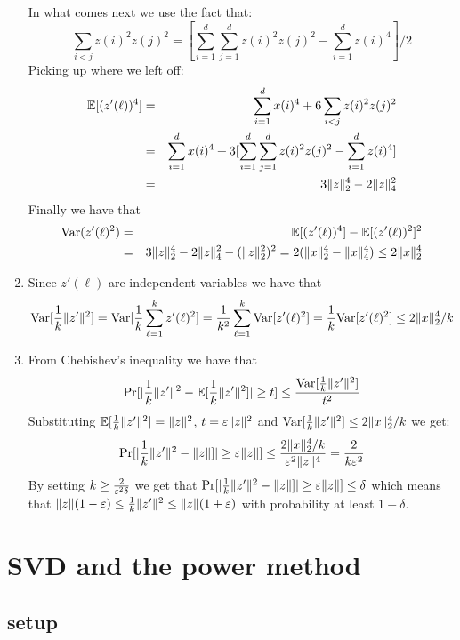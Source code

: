 \begin{enumerate}
In what comes next we use the fact that:
\[
\sum_{i<j}z(i)^2 z(j)^2 = [\sum_{i=1}^{d}\sum_{j=1}^{d}z(i)^2 z(j)^2 -  \sum_{i=1}^{d}z(i)^4]/2
\]
Picking up where we left off:
\begin{eqnarray*}
{\mathbb E}[(z'(\ell))^4] &=& \sum_{i=1}^{d}x(i)^4 + 6 \sum_{i<j}z(i)^2 z(j)^2\\
&=& \sum_{i=1}^{d}x(i)^4 + 3[\sum_{i=1}^{d}\sum_{j=1}^{d}z(i)^2 z(j)^2 -  \sum_{i=1}^{d}z(i)^4] \\
&=& 3\|z\|_{2}^{4} - 2\|z\|_4^2 
\end{eqnarray*}
Finally we have that 
\begin{eqnarray*}
{\operatorname{Var}}( z'(\ell)^2) &=& {\mathbb E}[(z'(\ell))^4]  -{\mathbb E}[(z'(\ell))^2]^2 \\
&=& 3\|z\|_{2}^{4} - 2\|z\|_4^2 - (\|z\|_{2}^{2})^2 = 2(\|x\|_2^4 - \|x\|_4^4) \le 2\|x\|_2^4 
\end{eqnarray*}
\item Since $z'(\ell)$ are independent variables we have that 
\[
{\operatorname{Var}}[\frac{1}{k}\|z'\|^2] = {\operatorname{Var}}[\frac{1}{k} \sum_{\ell=1}^{k}z'(\ell)^2] =  \frac{1}{k^2}\sum_{\ell=1}^{k}{\operatorname{Var}}[z'(\ell)^2] = \frac{1}{k}{\operatorname{Var}}[z'(\ell)^2] \le 2\|x\|_2^4/k
\]
\item From Chebishev's inequality we have that 
\[
\Pr[|\frac{1}{k}\|z'\|^2 - {\mathbb E}[\frac{1}{k}\|z'\|^2]| \ge t] \le \frac{{\operatorname{Var}}[\frac{1}{k}\|z'\|^2]}{t^2}
\]
Substituting ${\mathbb E}[\frac{1}{k}\|z'\|^2] = \|z\|^2$, $t = \varepsilon\|z\|^2$ and ${\operatorname{Var}}[\frac{1}{k}\|z'\|^2] \le 2\|x\|_2^4/k$ we get:
\[
\Pr[|\frac{1}{k}\|z'\|^2 - \|z\|]| \ge \varepsilon \|z\|] \le \frac{2\|x\|_2^4/k}{\varepsilon^2\|z\|^4} = \frac{2}{k\varepsilon^2} 
\]
By setting $k \ge \frac{2}{\varepsilon^2 \delta}$ we get that $\Pr[|\frac{1}{k}\|z'\|^2 - \|z\|]| \ge \varepsilon \|z\|] \le \delta$ which means that
$\|z\|(1-\varepsilon)\le \frac{1}{k}\|z'\|^2 \le \|z\|(1+\varepsilon)$ with probability at least $1-\delta$.
\end{enumerate}









\pagebreak

\section{SVD and the power method}
\subsection*{setup}

